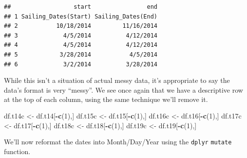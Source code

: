 \documentclass[
  11,
]{book}
\newenvironment{Shaded}{\begin{snugshade}}{\end{snugshade}}
\newcommand{\DecValTok}[1]{\textcolor[rgb]{0.06,0.06,0.06}{#1}}
\newcommand{\FunctionTok}[1]{\textcolor[rgb]{0.27,0.27,0.27}{\textbf{#1}}}
\newcommand{\NormalTok}[1]{#1}
\newcommand{\OtherTok}[1]{\textcolor[rgb]{0.37,0.37,0.37}{#1}}
\newcommand{\SpecialCharTok}[1]{\textcolor[rgb]{0.43,0.43,0.43}{\textbf{#1}}}
\begin{document}
\begin{verbatim}
##                  start                end
## 1 Sailing_Dates(Start) Sailing_Dates(End)
## 2           10/18/2014         11/16/2014
## 3             4/5/2014          4/12/2014
## 4             4/5/2014          4/12/2014
## 5            3/28/2014           4/5/2014
## 6             3/2/2014          3/28/2014
\end{verbatim}

While this isn't a situation of actual messy data, it's appropriate to say the data's format is very ``messy''. We see once again that we have a descriptive row at the top of each column, using the same technique we'll remove it.

\begin{Shaded}
\begin{Highlighting}[]
\NormalTok{df.t14c }\OtherTok{\textless{}{-}}\NormalTok{ df.t14[}\SpecialCharTok{{-}}\FunctionTok{c}\NormalTok{(}\DecValTok{1}\NormalTok{),]}
\NormalTok{df.t15c }\OtherTok{\textless{}{-}}\NormalTok{ df.t15[}\SpecialCharTok{{-}}\FunctionTok{c}\NormalTok{(}\DecValTok{1}\NormalTok{),]}
\NormalTok{df.t16c }\OtherTok{\textless{}{-}}\NormalTok{ df.t16[}\SpecialCharTok{{-}}\FunctionTok{c}\NormalTok{(}\DecValTok{1}\NormalTok{),]}
\NormalTok{df.t17c }\OtherTok{\textless{}{-}}\NormalTok{ df.t17[}\SpecialCharTok{{-}}\FunctionTok{c}\NormalTok{(}\DecValTok{1}\NormalTok{),]}
\NormalTok{df.t18c }\OtherTok{\textless{}{-}}\NormalTok{ df.t18[}\SpecialCharTok{{-}}\FunctionTok{c}\NormalTok{(}\DecValTok{1}\NormalTok{),]}
\NormalTok{df.t19c }\OtherTok{\textless{}{-}}\NormalTok{ df.t19[}\SpecialCharTok{{-}}\FunctionTok{c}\NormalTok{(}\DecValTok{1}\NormalTok{),]}
\end{Highlighting}
\end{Shaded}

We'll now reformat the dates into Month/Day/Year using the \texttt{dplyr} \texttt{mutate} function.
\end{document}
